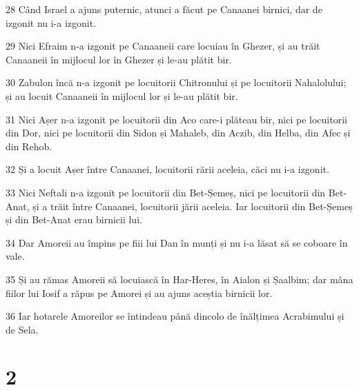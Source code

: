 \par 28 Când Israel a ajuns puternic, atunci a făcut pe Canaanei birnici, dar de izgonit nu i-a izgonit.
\par 29 Nici Efraim n-a izgonit pe Canaaneii care locuiau în Ghezer, și au trăit Canaaneii în mijlocul lor în Ghezer și le-au plătit bir.
\par 30 Zabulon încă n-a izgonit pe locuitorii Chitronului și pe locuitorii Nahalolului; și au locuit Canaaneii în mijlocul lor și le-au plătit bir.
\par 31 Nici Așer n-a izgonit pe locuitorii din Aco care-i plăteau bir, nici pe locuitorii din Dor, nici pe locuitorii din Sidon și Mahaleb, din Aczib, din Helba, din Afec și din Rehob.
\par 32 Și a locuit Așer între Canaanei, locuitorii rării aceleia, căci nu i-a izgonit.
\par 33 Nici Neftali n-a izgonit pe locuitorii din Bet-Șemeș, nici pe locuitorii din Bet-Anat, și a trăit între Canaanei, locuitorii jării aceleia. Iar locuitorii din Bet-Șemeș și din Bet-Anat erau birnicii lui.
\par 34 Dar Amoreii au împins pe fiii lui Dan în munți și nu i-a lăsat să se coboare în vale.
\par 35 Și au rămas Amoreii să locuiască în Har-Heres, în Aialon și Șaalbim; dar mâna fiilor lui Iosif a răpus pe Amorei și au ajuns aceștia birnicii lor.
\par 36 Iar hotarele Amoreilor se întindeau până dincolo de înălțimea Acrabimului și de Sela.

\chapter{2}

